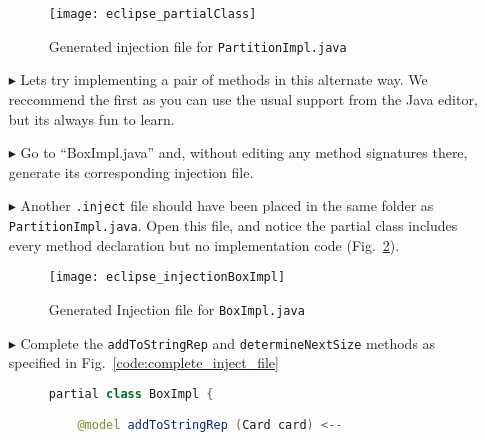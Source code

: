 \begin{itemize}
\begin{figure}[htbp]
    \centering
    \texttt{[image: eclipse\_partialClass]}
    \caption{Generated injection file for \texttt{PartitionImpl.java}}
    \label{fig:injection_partialClassPartition}
\end{figure}

\clearpage

\item[$\blacktriangleright$] Lets try implementing a pair of methods in this alternate way. We reccommend the first as you can use the usual support
from the Java editor, but its always fun to learn.

\vspace{0.5cm}

\item[$\blacktriangleright$] Go to ``BoxImpl.java'' and, without editing any method signatures there, generate its corresponding injection file.

\vspace{0.5cm}

\item[$\blacktriangleright$] Another \texttt{.inject} file should have been placed in the same folder as \texttt{PartitionImpl.java}. Open this file, and notice
the partial class includes every method declaration but no implementation code (Fig.~\ref{fig:injection_partialClassBox}).

\vspace{0.5cm}

\begin{figure}[htbp]
    \centering
    \texttt{[image: eclipse\_injectionBoxImpl]}
    \caption{Generated Injection file for \texttt{BoxImpl.java}}
    \label{fig:injection_partialClassBox}
\end{figure}

\vspace{0.5cm}

\item[$\blacktriangleright$] Complete the \texttt{addToStringRep} and \texttt{determineNextSize} methods as specified in Fig.~\ref{code:complete_inject_file}

\begin{figure}[htbp]
        \centering
        \begin{lstlisting}[language=Java, keywordstyle={\bfseries\color{purple}}, backgroundcolor=\color{white}]
partial class BoxImpl {

    @model addToStringRep (Card card) <--


\end{lstlisting}
\end{figure}
\end{itemize}
